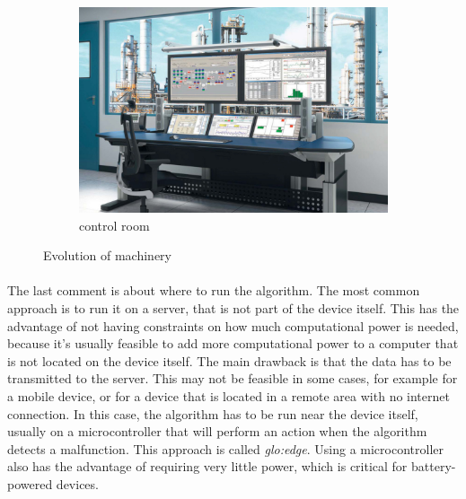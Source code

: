 \begin{figure}
\begin{subfigure}{0.3\textwidth}
        \includegraphics[width=\textwidth]{images/Intro/control-rooms-workstations.jpg}
        \caption{control room \cite{evosite}}
        \label{fig:controlroom}
    \end{subfigure}
    \caption{Evolution of machinery}
    \label{fig:machineryevolution}
\end{figure}

\paragraph*{}
The last comment is about where to run the algorithm. The most common approach is to run it on a server, that is not part of the device itself. This has the advantage of not having constraints on how much computational power is needed, because it's usually feasible to add more computational power to a computer that is not located on the device itself. The main drawback is that the data has to be transmitted to the server. This may not be feasible in some cases, for example for a mobile device, or for a device that is located in a remote area with no internet connection. In this case, the algorithm has to be run near the device itself, usually on a microcontroller that will perform an action when the algorithm detects a malfunction. This approach is called \emph{\gls{glo:edge}}. Using a microcontroller also has the advantage of requiring very little power, which is critical for battery-powered devices.


